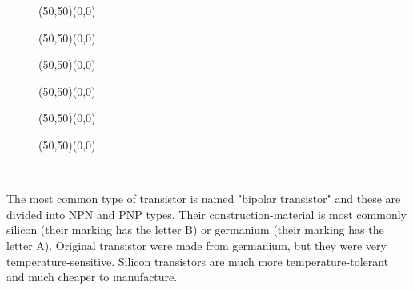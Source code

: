 	\begin{figure}[H]
		\vspace{1cm}
		\begin{center}
		\begin{picture}(50,50)(0,0)
		\end{picture}
		\begin{picture}(50,50)(0,0)
		\end{picture}
		\begin{picture}(50,50)(0,0)
		\end{picture}
		\begin{picture}(50,50)(0,0)
		\end{picture}
		\begin{picture}(50,50)(0,0)
		\end{picture}
		\begin{picture}(50,50)(0,0)
		\end{picture}\\[2cm]
		\end{center}
	\end{figure}
	
	The most common type of transistor is named "bipolar transistor" and these are divided into NPN and PNP types.
Their construction-material is most commonly silicon (their marking has the letter B) or germanium (their marking has the letter A). Original transistor were made from germanium, but they were very temperature-sensitive. Silicon transistors are much more temperature-tolerant and much cheaper to manufacture.

